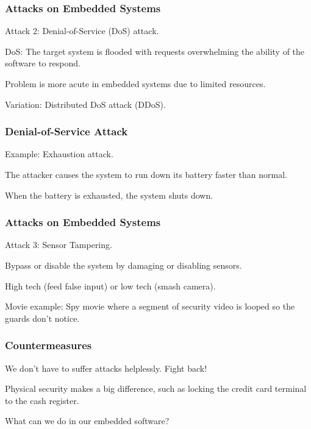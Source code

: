 \begin{frame}
\frametitle{Attacks on Embedded Systems}
\begin{changemargin}{1cm}

Attack 2: Denial-of-Service (DoS) attack.

DoS: The target system is flooded with requests overwhelming the ability of the software to respond.

Problem is more acute in embedded systems due to limited resources.

Variation: Distributed DoS attack (DDoS).

\end{changemargin}
\end{frame}

\begin{frame}
\frametitle{Denial-of-Service Attack}
\begin{changemargin}{1cm}

Example: Exhaustion attack.

The attacker causes the system to run down its battery faster than normal. 

When the battery is exhausted, the system shuts down.

\end{changemargin}
\end{frame}

\begin{frame}
\frametitle{Attacks on Embedded Systems}
\begin{changemargin}{1cm}

Attack 3: Sensor Tampering.

Bypass or disable the system by damaging or disabling sensors.

High tech (feed false input) or low tech (smash camera).

Movie example: Spy movie where a segment of security video is looped so the guards don't notice.

\end{changemargin}
\end{frame}


\begin{frame}
\frametitle{Countermeasures}
\begin{changemargin}{1cm}

We don't have to suffer attacks helplessly. Fight back!

Physical security makes a big difference, such as locking the credit card terminal to the cash register.

What can we do in our embedded software?

\end{changemargin}
\end{frame}

